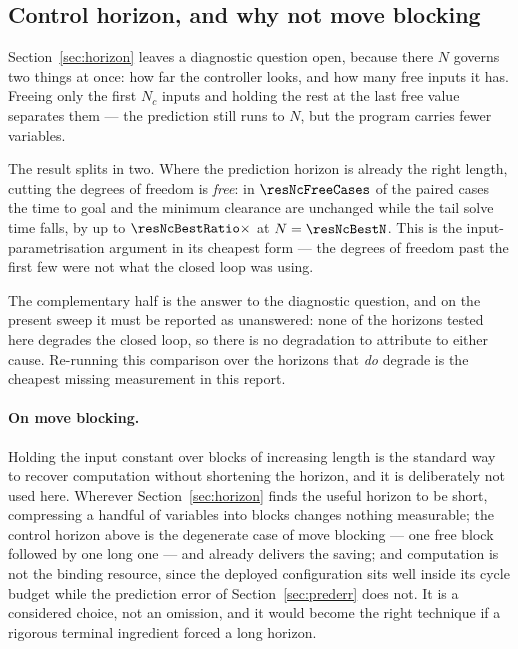 \documentclass[11pt,a4paper]{article}
\newcommand{\Ninput}{N_c}
\begin{document}
\subsection{Control horizon, and why not move blocking}
\label{sec:nc}

Section~\ref{sec:horizon} leaves a diagnostic question open, because there $N$ governs two things at once:
how far the controller looks, and how many free inputs it has. Freeing only the first $\Ninput$ inputs and
holding the rest at the last free value separates them --- the prediction still runs to $N$, but the program
carries fewer variables.


The result splits in two. Where the prediction horizon is already the right length, cutting the degrees of
freedom is \emph{free}: in $\resNcFreeCases$ of the paired cases the time to goal and the minimum clearance
are unchanged while the tail solve time falls, by up to $\resNcBestRatio\times$ at $N=\resNcBestN$. This is
the input-parametrisation argument in its cheapest form --- the degrees of freedom past the first few were
not what the closed loop was using.

The complementary half is the answer to the diagnostic question, and on the present sweep it must be reported
as unanswered: none of the horizons tested here degrades the closed loop, so there is no degradation to
attribute to either cause. Re-running this comparison over the horizons that \emph{do} degrade is the
cheapest missing measurement in this report.

\paragraph{On move blocking.} Holding the input constant over blocks of increasing length is the standard way
to recover computation without shortening the horizon, and it is deliberately not used here. Wherever
Section~\ref{sec:horizon} finds the useful horizon to be short, compressing a handful of variables into
blocks changes nothing measurable; the control horizon above is the degenerate case of move blocking --- one
free block followed by one long one --- and already delivers the saving; and computation is not the binding
resource, since the deployed configuration sits well inside its cycle budget while the prediction error of
Section~\ref{sec:prederr} does not. It is a considered choice, not an omission, and it would become the right
technique if a rigorous terminal ingredient forced a long horizon.
\end{document}

